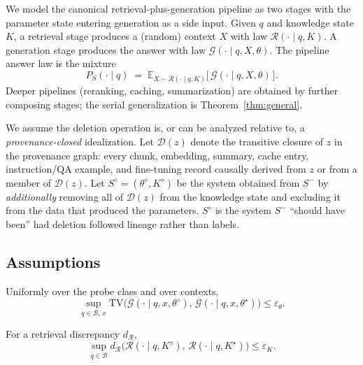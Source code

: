 We model the canonical retrieval-plus-generation pipeline as two stages
with the parameter state entering generation as a side input. Given $q$
and knowledge state $K$, a retrieval stage produces a (random) context
$X$ with law $\mathcal{R}(\cdot\mid q,K)$. A generation stage produces
the answer with law $\mathcal{G}(\cdot\mid q,X,\theta)$. The pipeline
answer law is the mixture
\begin{equation}
\label{eq:pipeline}
 P_{S}(\cdot\mid q)
 \;=\;
 \mathbb{E}_{X\sim\mathcal{R}(\cdot\mid q,K)}
 \big[\,\mathcal{G}(\cdot\mid q,X,\theta)\,\big].
\end{equation}
Deeper pipelines (reranking, caching, summarization) are obtained by
further composing stages; the serial generalization is
Theorem~\ref{thm:general}.

We assume the deletion operation is, or can be analyzed relative to, a
\emph{provenance-closed} idealization. Let $\mathcal{D}(z)$ denote the
transitive closure of $z$ in the provenance graph: every chunk,
embedding, summary, cache entry, instruction/QA example, and
fine-tuning record causally derived from $z$ or from a member of
$\mathcal{D}(z)$. Let $S^{\diamond}=(\theta^{\diamond},K^{\diamond})$ be
the system obtained from $S^{-}$ by \emph{additionally} removing all of
$\mathcal{D}(z)$ from the knowledge state and excluding it from the data
that produced the parameters. $S^{\diamond}$ is the system $S^{-}$
``should have been'' had deletion followed lineage rather than labels.

\subsection{Assumptions}

\begin{assumption}
\label{a:theta}
Uniformly over the probe class and over contexts,
\[
 \sup_{q\in\mathcal{B},\,x}
 \mathrm{TV}\!\big(\mathcal{G}(\cdot\mid q,x,\theta^{\diamond}),\,
 \mathcal{G}(\cdot\mid q,x,\theta^{\star})\big)\le\varepsilon_{\theta}.
\]
\end{assumption}

\begin{assumption}
\label{a:k}
For a retrieval discrepancy $d_{\mathcal{R}}$,
\[
 \sup_{q\in\mathcal{B}}
 d_{\mathcal{R}}\!\big(\mathcal{R}(\cdot\mid q,K^{\diamond}),\,
 \mathcal{R}(\cdot\mid q,K^{\star})\big)\le\varepsilon_{K}.
\]
\end{assumption}

